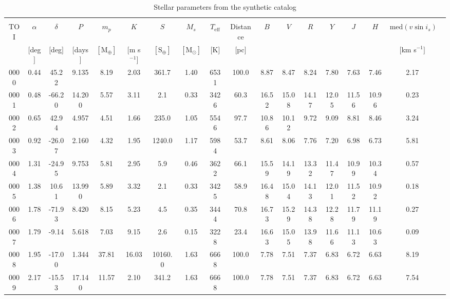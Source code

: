 \clearpage
\begin{landscape}
\begin{table*}
  \small
  \renewcommand{\arraystretch}{0.7}
  \caption{Stellar parameters from the  synthetic catalog}
  \label{RVFCtable:stars}
  \begin{tabular}{cccccccccccccccccc}
    \hline \\ [-1ex]
    TOI & $\alpha$ & $\delta$ & $P$ & $m_p$ & $K$ & $S$ & $M_s$ & $T_{\text{eff}}$ & Distance & $B$ & $V$ & $R$ & $Y$ & $J$ & $H$ & $\text{med}(v\sin{i_s})$ & \\ & $[$deg$]$ & $[$deg$]$ & $[$days$]$ & $[\text{M}_{\oplus}]$ & $[$m s$^{-1}]$ & $[\text{S}_{\oplus}]$ & $[\text{M}_{\odot}]$ & $[$K$]$ & $[$pc$]$ & & & & & & & $[$km s$^{-1}]$ \\
\hline
0000 & 0.44 & 45.22 & 9.135 & 8.19 & 2.03 & 361.7 & 1.40 & 6531 & 100.0 & 8.87 & 8.47 & 8.24 & 7.80 & 7.63 & 7.46 & 2.17 \\ 
0001 & 0.48 & -66.20 & 14.200 & 5.57 & 3.11 & 2.1 & 0.33 & 3426 & 60.3 & 16.52 & 15.08 & 14.17 & 12.05 & 11.56 & 10.96 & 0.23 \\ 
0002 & 0.65 & 42.94 & 4.957 & 4.51 & 1.66 & 235.0 & 1.05 & 5546 & 97.7 & 10.86 & 10.12 & 9.72 & 9.09 & 8.81 & 8.46 & 3.24 \\ 
0003 & 0.92 & -26.07 & 2.160 & 4.32 & 1.95 & 1240.0 & 1.17 & 5984 & 53.7 & 8.61 & 8.06 & 7.76 & 7.20 & 6.98 & 6.73 & 5.81 \\ 
0004 & 1.31 & -24.95 & 9.753 & 5.81 & 2.95 & 5.9 & 0.46 & 3622 & 66.1 & 15.59 & 14.19 & 13.32 & 11.47 & 10.99 & 10.34 & 0.57 \\ 
0005 & 1.38 & 10.61 & 13.990 & 5.89 & 3.32 & 2.1 & 0.33 & 3425 & 58.9 & 16.48 & 15.04 & 14.13 & 12.01 & 11.52 & 10.92 & 0.18 \\ 
0006 & 1.78 & -71.93 & 8.420 & 8.15 & 5.23 & 4.5 & 0.35 & 3444 & 70.8 & 16.73 & 15.29 & 14.38 & 12.28 & 11.79 & 11.19 & 0.27 \\ 
0007 & 1.79 & -9.14 & 5.618 & 7.03 & 9.15 & 2.6 & 0.15 & 3228 & 23.4 & 16.63 & 15.05 & 13.98 & 11.66 & 11.13 & 10.63 & 0.09 \\ 
0008 & 1.95 & -17.00 & 1.344 & 37.81 & 16.03 & 10160.0 & 1.63 & 6668 & 100.0 & 7.78 & 7.51 & 7.37 & 6.83 & 6.72 & 6.63 & 8.19 \\ 
0009 & 2.17 & -15.53 & 17.140 & 11.57 & 2.10 & 341.2 & 1.63 & 6668 & 100.0 & 7.78 & 7.51 & 7.37 & 6.83 & 6.72 & 6.63 & 7.54 \\ 

\end{tabular}
\end{table*}
\end{landscape}
